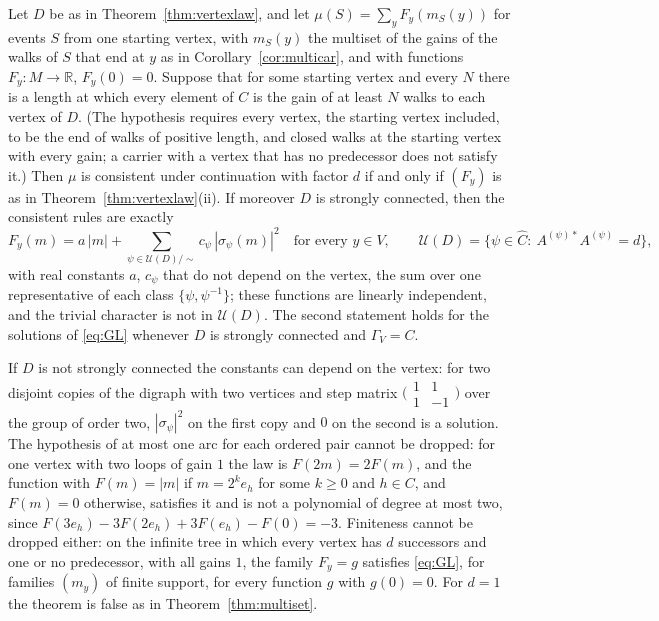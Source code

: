 \begin{corollary}\label{cor:vertexlaw}
Let $D$ be as in Theorem~\ref{thm:vertexlaw}, and let $\mu(S)=\sum_{y}F_y(m_S(y))$ for events $S$ from one starting vertex, with $m_S(y)$ the multiset of the gains of the walks of $S$ that end at $y$ as in Corollary~\ref{cor:multicar}, and with functions $F_y\colon M\to\mathbb{R}$, $F_y(0)=0$. Suppose that for some starting vertex and every $N$ there is a length at which every element of $C$ is the gain of at least $N$ walks to each vertex of $D$. (The hypothesis requires every vertex, the starting vertex included, to be the end of walks of positive length, and closed walks at the starting vertex with every gain; a carrier with a vertex that has no predecessor does not satisfy it.) Then $\mu$ is consistent under continuation with factor $d$ if and only if $(F_y)$ is as in Theorem~\ref{thm:vertexlaw}(ii). If moreover $D$ is strongly connected, then the consistent rules are exactly
\[
F_y(m)=a\,|m|+\sum_{\psi\in\mathcal{U}(D)/\sim}c_\psi\,|\sigma_\psi(m)|^2\quad\text{for every }y\in V,\qquad
\mathcal{U}(D)=\{\psi\in\hat C:\ A^{(\psi)*}A^{(\psi)}=d\},
\]
with real constants $a$, $c_\psi$ that do not depend on the vertex, the sum over one representative of each class $\{\psi,\psi^{-1}\}$; these functions are linearly independent, and the trivial character is not in $\mathcal{U}(D)$. The second statement holds for the solutions of \eqref{eq:GL} whenever $D$ is strongly connected and $\Gamma_V=C$.
\end{corollary}

If $D$ is not strongly connected the constants can depend on the vertex: for two disjoint copies of the digraph with two vertices and step matrix $\bigl(\begin{smallmatrix}1&1\\1&-1\end{smallmatrix}\bigr)$ over the group of order two, $|\sigma_\psi|^2$ on the first copy and $0$ on the second is a solution. The hypothesis of at most one arc for each ordered pair cannot be dropped: for one vertex with two loops of gain $1$ the law is $F(2m)=2F(m)$, and the function with $F(m)=|m|$ if $m=2^ke_h$ for some $k\ge0$ and $h\in C$, and $F(m)=0$ otherwise, satisfies it and is not a polynomial of degree at most two, since $F(3e_h)-3F(2e_h)+3F(e_h)-F(0)=-3$. Finiteness cannot be dropped either: on the infinite tree in which every vertex has $d$ successors and one or no predecessor, with all gains $1$, the family $F_y=g$ satisfies \eqref{eq:GL}, for families $(m_y)$ of finite support, for every function $g$ with $g(0)=0$. For $d=1$ the theorem is false as in Theorem~\ref{thm:multiset}.

